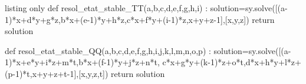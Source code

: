 \documentclass[french,a4paper,11pt]{article}
\begin{document}
\begin{PresentationCodePython}{listing only}
def resol_etat_stable_TT(a,b,c,d,e,f,g,h,i) :
	solution=sy.solve([(a-1)*x+d*y+g*z,b*x+(e-1)*y+h*z,c*x+f*y+(i-1)*z,x+y+z-1],[x,y,z])
	return solution

def resol_etat_stable_QQ(a,b,c,d,e,f,g,h,i,j,k,l,m,n,o,p) :
	solution=sy.solve([(a-1)*x+e*y+i*z+m*t,b*x+(f-1)*y+j*z+n*t,
	c*x+g*y+(k-1)*z+o*t,d*x+h*y+l*z+(p-1)*t,x+y+z+t-1],[x,y,z,t])
	return solution
\end{PresentationCodePython}
\end{document}
